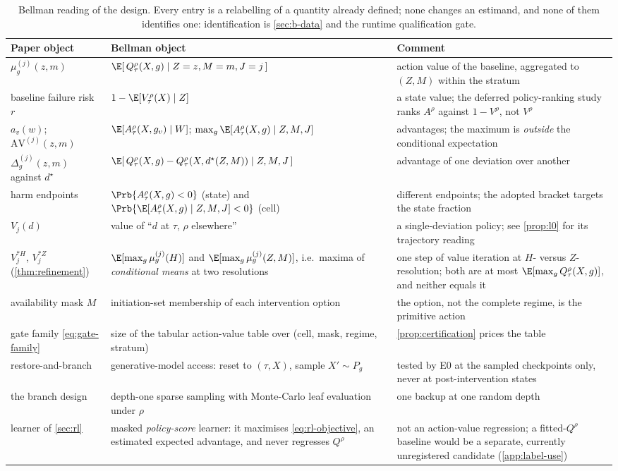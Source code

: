 \begin{table}[H]
\centering
\footnotesize
\setlength{\tabcolsep}{4pt}
\begin{tabular}{@{}p{3.0cm}p{5.5cm}p{4.7cm}@{}}
\toprule
Paper object & Bellman object & Comment \\
\midrule
$\mu^{(j)}_g(z,m)$ & $\E[\,Q^\rho_\tau(X,g)\mid Z=z,M=m,J=j\,]$ & action value of the baseline, aggregated to $(Z,M)$ within the stratum \\
baseline failure risk $r$ & $1-\E[V^\rho_\tau(X)\mid Z]$ & a state value; the deferred policy-ranking study ranks $A^\rho$ against $1-V^\rho$, not $V^\rho$ \\
$a_v(w)$; $\mathrm{AV}^{(j)}(z,m)$ & $\E[A^\rho_\tau(X,g_v)\mid W]$; $\max_g\E[A^\rho_\tau(X,g)\mid Z,M,J]$ & advantages; the maximum is \emph{outside} the conditional expectation \\
$\Delta^{(j)}_g(z,m)$ against $d^\star$ & $\E[\,Q^\rho_\tau(X,g)-Q^\rho_\tau(X,d^\star(Z,M))\mid Z,M,J\,]$ & advantage of one deviation over another \\
harm endpoints & $\Prb\{A^\rho_\tau(X,g)<0\}$ (state) and $\Prb\{\E[A^\rho_\tau(X,g)\mid Z,M,J]<0\}$ (cell) & different endpoints; the adopted bracket targets the state fraction \\
$V_j(d)$ & value of ``$d$ at $\tau$, $\rho$ elsewhere'' & a single-deviation policy; see \cref{prop:l0} for its trajectory reading \\
$V^{*H}_j$, $V^{*Z}_j$ (\cref{thm:refinement}) & $\E[\max_g\mu^{(j)}_g(H)]$ and $\E[\max_g\mu^{(j)}_g(Z,M)]$, i.e.\ maxima of \emph{conditional means} at two resolutions & one step of value iteration at $H$- versus $Z$-resolution; both are at most $\E[\max_g Q^\rho_\tau(X,g)]$, and neither equals it \\
availability mask $M$ & initiation-set membership of each intervention option & the option, not the complete regime, is the primitive action \\
gate family \eqref{eq:gate-family} & size of the tabular action-value table over (cell, mask, regime, stratum) & \cref{prop:certification} prices the table \\
restore-and-branch & generative-model access: reset to $(\tau,X)$, sample $X'\sim P_g$ & tested by E0 at the sampled checkpoints only, never at post-intervention states \\
the branch design & depth-one sparse sampling with Monte-Carlo leaf evaluation under $\rho$ & one backup at one random depth \\
learner of \cref{sec:rl} & masked \emph{policy-score} learner: it maximises \eqref{eq:rl-objective}, an estimated expected advantage, and never regresses $Q^\rho$ & not an action-value regression; a fitted-$Q^\rho$ baseline would be a separate, currently unregistered candidate (\cref{app:label-use}) \\
\bottomrule
\end{tabular}
\caption{Bellman reading of the design.  Every entry is a relabelling of a
quantity already defined; none changes an estimand, and none of them
identifies one: identification is \cref{sec:b-data} and the runtime qualification gate.}
\label{tab:bellman-dictionary}
\end{table}
